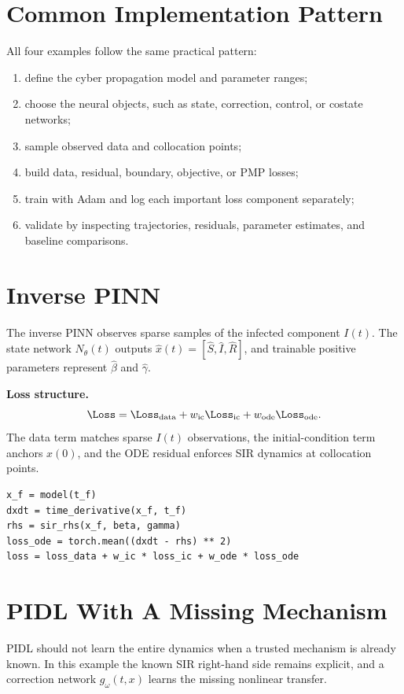 \documentclass[11pt,a4paper]{article}
\begin{document}
\section{Common Implementation Pattern}
All four examples follow the same practical pattern:
\begin{enumerate}
\item define the cyber propagation model and parameter ranges;
\item choose the neural objects, such as state, correction, control, or costate networks;
\item sample observed data and collocation points;
\item build data, residual, boundary, objective, or PMP losses;
\item train with Adam and log each important loss component separately;
\item validate by inspecting trajectories, residuals, parameter estimates, and baseline comparisons.
\end{enumerate}

\section{Inverse PINN}
The inverse PINN observes sparse samples of the infected component \(I(t)\). The state network \(N_\theta(t)\) outputs \(\hat{x}(t)=[\hat{S},\hat{I},\hat{R}]\), and trainable positive parameters represent \(\hat{\beta}\) and \(\hat{\gamma}\).

\begin{methodbox}
\textbf{Loss structure.}
\[
\Loss = \Loss_{\rm data} + w_{\rm ic}\Loss_{\rm ic} + w_{\rm ode}\Loss_{\rm ode}.
\]
The data term matches sparse \(I(t)\) observations, the initial-condition term anchors \(x(0)\), and the ODE residual enforces SIR dynamics at collocation points.
\end{methodbox}

\begin{lstlisting}[style=pythonstyle,caption={Core inverse-PINN residual idea.}]
x_f = model(t_f)
dxdt = time_derivative(x_f, t_f)
rhs = sir_rhs(x_f, beta, gamma)
loss_ode = torch.mean((dxdt - rhs) ** 2)
loss = loss_data + w_ic * loss_ic + w_ode * loss_ode
\end{lstlisting}

\section{PIDL With A Missing Mechanism}
PIDL should not learn the entire dynamics when a trusted mechanism is already known. In this example the known SIR right-hand side remains explicit, and a correction network \(g_\omega(t,x)\) learns the missing nonlinear transfer.
\end{document}
